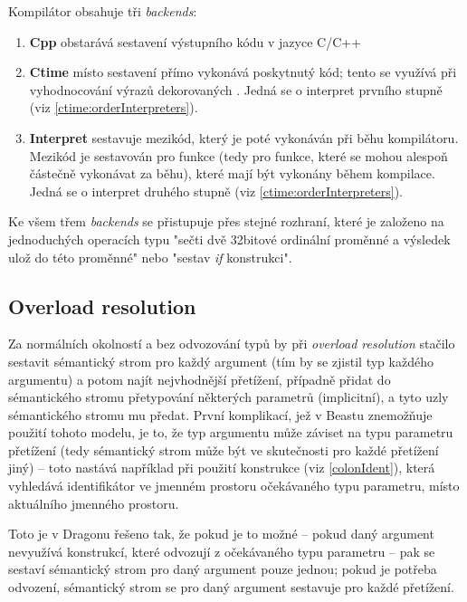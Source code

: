 Kompilátor obsahuje tři \textit{backends}:
\begin{enumerate}
	\item \textbf{Cpp} obstarává sestavení výstupního kódu v jazyce C/C++
	\item \textbf{Ctime} místo sestavení přímo vykonává poskytnutý kód; tento se využívá při vyhodnocování výrazů dekorovaných . Jedná se o interpret prvního stupně (viz \autoref{ctime:orderInterpreters}).
	\item \textbf{Interpret} sestavuje mezikód, který je poté vykonáván při běhu kompilátoru. Mezikód je sestavován pro \nonctime funkce (tedy pro funkce, které se mohou alespoň částečně vykonávat za běhu), které mají být vykonány během kompilace. Jedná se o interpret druhého stupně (viz \autoref{ctime:orderInterpreters}).
\end{enumerate}

Ke všem třem \textit{backends} se přistupuje přes stejné rozhraní, které je založeno na jednoduchých operacích typu "sečti dvě 32bitové ordinální proměnné a výsledek ulož do této proměnné" nebo "sestav \textit{if} konstrukci".


\subsection{Overload resolution} \label{sec:overloadResolution}
Za normálních okolností a bez odvozování typů by při \textit{overload resolution} stačilo sestavit sémantický strom pro každý argument (tím by se zjistil typ každého argumentu) a potom najít nejvhodnější přetížení, případně přidat do sémantického stromu přetypování některých parametrů (implicitní), a tyto uzly sémantického stromu mu předat. První komplikací, jež v Beastu znemožňuje použití tohoto modelu, je to, že typ argumentu může záviset na typu parametru přetížení (tedy sémantický strom může být ve skutečnosti pro každé přetížení jiný) -- toto nastává například při použití konstrukce  (viz \autoref{colonIdent}), která vyhledává identifikátor  ve jmenném prostoru očekávaného typu parametru, místo aktuálního jmenného prostoru.

Toto je v Dragonu řešeno tak, že pokud je to možné -- pokud daný argument nevyužívá konstrukcí, které odvozují z očekávaného typu parametru -- pak se sestaví sémantický strom pro daný argument pouze jednou; pokud je potřeba odvození, sémantický strom se pro daný argument sestavuje pro každé přetížení.

